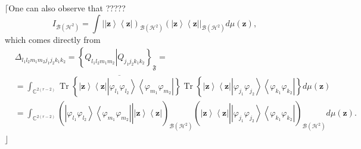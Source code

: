 \documentclass[aps,preprint]{revtex4}%
\begin{document}
$\lceil$One can also observe that ?????
\begin{equation}
I_{\mathcal{B}\left(  \mathcal{H}^{2}\right)  }=\int\left\vert \left\vert
\mathbf{z}\right\rangle \left\langle \mathbf{z}\right\vert \right)
_{\mathcal{B}\left(  \mathcal{H}^{2}\right)  }\left(  \left\vert
\mathbf{z}\right\rangle \left\langle \mathbf{z}\right\vert \right\vert
_{\mathcal{B}\left(  \mathcal{H}^{2}\right)  }d\mu\left(  \mathbf{z}\right)  ,
\end{equation}
which comes directly from
\begin{align}
&  \Delta_{l_{1}l_{2}m_{1}m_{2}j_{1}j_{2}k_{1}k_{2}}=\left\{  Q_{l_{1}%
l_{2}m_{1}m_{2}}\left\vert Q_{j_{1}j_{2}k_{1}k_{2}}\right.  \right\}
_{\mathfrak{F}}=\nonumber\\
&  =\int_{\mathbb{C}^{2\left(  r-2\right)  }}\overline{\operatorname*{Tr}%
\left\{  \left\vert \mathbf{z}\right\rangle \left\langle \mathbf{z}\right\vert
\left\vert \varphi_{l_{1}}\varphi_{l_{2}}\right\rangle \left\langle
\varphi_{m_{1}}\varphi_{m_{2}}\right\vert \right\}  }\operatorname*{Tr}%
\left\{  \left\vert \mathbf{z}\right\rangle \left\langle \mathbf{z}\right\vert
\left\vert \varphi_{j_{1}}\varphi_{j_{2}}\right\rangle \left\langle
\varphi_{k_{1}}\varphi_{k_{2}}\right\vert \right\}  d\mu\left(  \mathbf{z}%
\right) \nonumber\\
&  =\int_{\mathbb{C}^{2\left(  r-2\right)  }}\left(  \left.
\overset{}{\left\vert \varphi_{l_{1}}\varphi_{l_{2}}\right\rangle \left\langle
\varphi_{m_{1}}\varphi_{m_{2}}\right\vert }\right\vert \left\vert
\mathbf{z}\right\rangle \left\langle \mathbf{z}\right\vert \right)
_{\mathcal{B}\left(  \mathcal{H}^{2}\right)  }\left(  \left\vert
\mathbf{z}\right\rangle \left\langle \mathbf{z}\right\vert \left\vert
\overset{}{\left\vert \varphi_{j_{1}}\varphi_{j_{2}}\right\rangle \left\langle
\varphi_{k_{1}}\varphi_{k_{2}}\right\vert }\right.  \right)  _{\mathcal{B}%
\left(  \mathcal{H}^{2}\right)  }d\mu\left(  \mathbf{z}\right)  .
\end{align}
$\rfloor$
\end{document}
